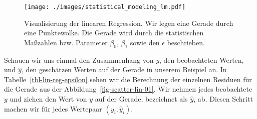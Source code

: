\documentclass[
  letterpaper,
]{scrbook}
\begin{document}
\begin{figure}

{\centering \texttt{[image: ./images/statistical\_modeling\_lm.pdf]}

}

\caption{\label{fig-lin-reg-01}Visualisierung der linearen Regression.
Wir legen eine Gerade durch eine Punktewolke. Die Gerade wird durch die
statistischen Maßzahlen bzw. Parameter \(\beta_0\), \(\beta_1\) sowie
den \(\epsilon\) beschrieben.}

\end{figure}

{}

Schauen wir uns einmal den Zusammenhang von \(y\), den beobachteten
Werten, und \(\hat{y}\), den geschätzen Werten auf der Gerade in unserem
Beispiel an. In Tabelle~\ref{tbl-lin-reg-epsilon} sehen wir die
Berechnung der einzelnen Residuen für die Gerade aus der
Abbildung~\ref{fig-scatter-lin-01}. Wir nehmen jedes beobachtete \(y\)
und ziehen den Wert von \(y\) auf der Gerade, bezeichnet als
\(\hat{y}\), ab. Diesen Schritt machen wir für jedes Wertepaar
\((y_i; \hat{y}_i)\).
\end{document}

